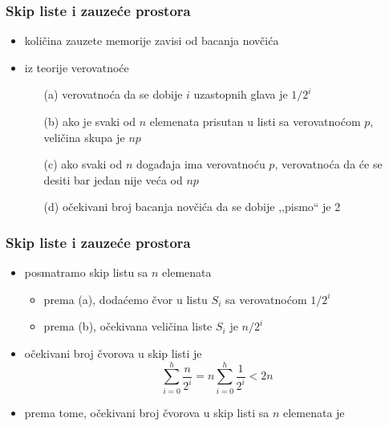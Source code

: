 \documentclass[compress]{beamer}
\begin{document}
\begin{frame}[fragile]
  \frametitle{Skip liste i zauzeće prostora}
  \begin{itemize}
    \item količina zauzete memorije zavisi od bacanja novčića
    \item iz teorije verovatnoće
    \begin{itemize}
      \item[(a)] verovatnoća da se dobije $i$ uzastopnih glava je $1/2^i$
      \item[(b)] ako je svaki od $n$ elemenata prisutan u listi sa verovatnoćom $p$, veličina skupa je $np$
      \item[(c)] ako svaki od $n$ događaja ima verovatnoću $p$, verovatnoća da će se desiti bar jedan nije veća od $np$
      \item[(d)] očekivani broj bacanja novčića da se dobije ,,pismo`` je 2
    \end{itemize}
  \end{itemize}
\end{frame}

\begin{frame}[fragile]
  \frametitle{Skip liste i zauzeće prostora}
  \begin{itemize}
    \item posmatramo skip listu sa $n$ elemenata
    \begin{itemize}
      \item prema (a), dodaćemo čvor u listu $S_i$ sa verovatnoćom $1/2^i$
      \item prema (b), očekivana veličina liste $S_i$ je $n/2^i$
    \end{itemize}
    \item očekivani broj čvorova u skip listi je
    $$ \sum_{i=0}^h \frac{n}{2^i} = n \sum_{i=0}^h \frac{1}{2^i} < 2n$$
    \item prema tome, očekivani broj čvorova u skip listi sa $n$ elemenata je 
  \end{itemize}
\end{frame}
\end{document}
